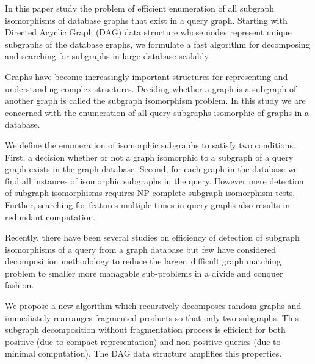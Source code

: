 
In this paper study the problem of efficient enumeration of all subgraph isomorphisms of database graphs that exist in a query graph. Starting with Directed Acyclic Graph (DAG) data structure whose nodes represent unique subgraphs of the database graphs, we formulate a fast algorithm for decomposing and searching for subgraphs in large database scalably.

Graphs have become increasingly important structures for representing and understanding complex structures. Deciding whether a graph is a subgraph of another graph is called the subgraph isomorphism problem. 
In this study we are concerned with the enumeration of all query subgraphs isomorphic of graphs in a database. 

We define the enumeration of isomorphic subgraphs to satisfy two conditions. First, a decision whether or not a graph isomorphic to a subgraph of a query graph exists in the graph database. Second, for each graph in the database we find all instances of isomorphic subgraphs in the query. 
However mere detection of subgraph isomorphisms requires NP-complete subgraph isomorphism tests. Further, searching for features multiple times in query graphs also results in redundant computation.

Recently, there have been several studies on efficiency of detection of subgraph isomorphisms of a query from a graph database but few have considered decomposition methodology to reduce the larger, difficult graph matching problem to smaller more managable sub-problems in a divide and conquer fashion. 


We propose a new algorithm which recursively decomposes random graphs and immediately rearranges fragmented products so that only two subgraphs. This subgraph decomposition without fragmentation process is efficient for both positive (due to compact representation) and non-positive queries (due to minimal computation). The DAG data structure amplifies this properties.


